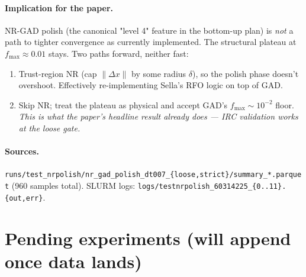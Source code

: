 \documentclass[11pt]{article}
\begin{document}
\paragraph{Implication for the paper.} NR-GAD polish (the canonical
"level 4" feature in the bottom-up plan) is \emph{not} a path to tighter
convergence as currently implemented. The structural plateau at
$f_{\max} \approx 0.01$ stays. Two paths forward, neither fast:
\begin{enumerate}[leftmargin=1.5em]
\item Trust-region NR (cap $\|\Delta x\|$ by some radius $\delta$), so
  the polish phase doesn't overshoot. Effectively re-implementing
  Sella's RFO logic on top of GAD.
\item Skip NR; treat the plateau as physical and accept GAD's
  $f_{\max}{\sim}10^{-2}$ floor. \emph{This is what the paper's headline
  result already does — IRC validation works at the loose gate.}
\end{enumerate}

\paragraph{Sources.}
\texttt{runs/test\_nrpolish/nr\_gad\_polish\_dt007\_\{loose,strict\}/summary\_*.parquet}
(960 samples total). SLURM logs:
\texttt{logs/testnrpolish\_60314225\_\{0..11\}.\{out,err\}}.

\newpage
\section{Pending experiments (will append once data lands)}
\end{document}
